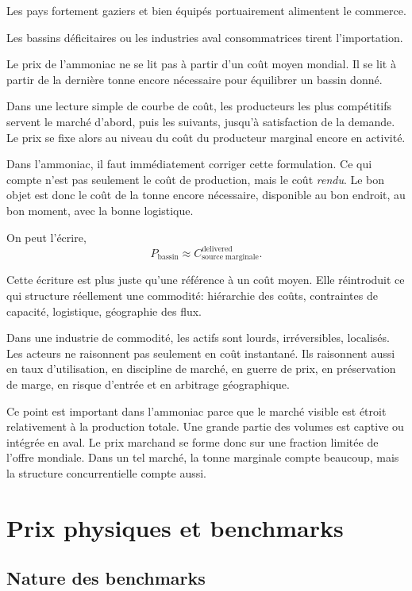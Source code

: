 \documentclass[11pt]{article}
\begin{document}
Les pays fortement gaziers et bien équipés portuairement alimentent le commerce.

Les bassins déficitaires ou les industries aval consommatrices tirent l'importation.


Le prix de l'ammoniac ne se lit pas à partir d'un coût moyen mondial. Il se lit à partir de la dernière tonne encore nécessaire pour équilibrer un bassin donné.

Dans une lecture simple de courbe de coût, les producteurs les plus compétitifs servent le marché d'abord, puis les suivants, jusqu'à satisfaction de la demande. Le prix se fixe alors au niveau du coût du producteur marginal encore en activité.

Dans l'ammoniac, il faut immédiatement corriger cette formulation. Ce qui compte n'est pas seulement le coût de production, mais le coût \emph{rendu}. Le bon objet est donc le coût de la tonne encore nécessaire, disponible au bon endroit, au bon moment, avec la bonne logistique.

On peut l'écrire, 
\[
P_{\mathrm{bassin}}
\approx
C^{\mathrm{delivered}}_{\mathrm{source\;marginale}}.
\]

Cette écriture est plus juste qu'une référence à un coût moyen. Elle réintroduit ce qui structure réellement une commodité: hiérarchie des coûts, contraintes de capacité, logistique, géographie des flux.



Dans une industrie de commodité, les actifs sont lourds, irréversibles, localisés. 
Les acteurs ne raisonnent pas seulement en coût instantané. 
Ils raisonnent aussi en taux d'utilisation, en discipline de marché, en guerre de prix, en préservation de marge, en risque d'entrée et en arbitrage géographique. \cite{tanguy}


Ce point est important dans l'ammoniac parce que le marché visible est étroit relativement à la production totale. 
Une grande partie des volumes est captive ou intégrée en aval. Le prix marchand se forme donc sur une fraction limitée de l'offre mondiale. 
Dans un tel marché, la tonne marginale compte beaucoup, mais la structure concurrentielle compte aussi.

\section{Prix physiques et benchmarks}

\subsection{Nature des benchmarks}
\end{document}
